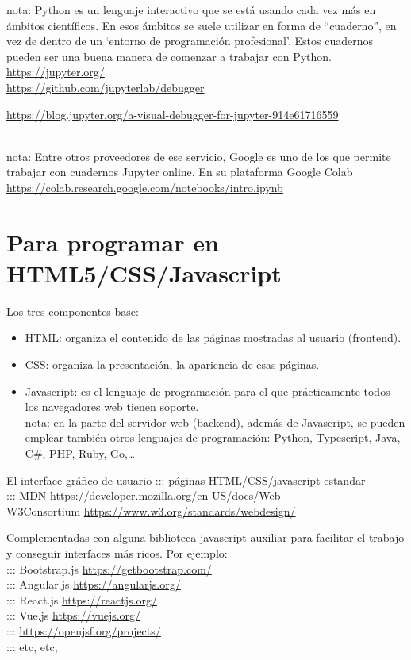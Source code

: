 \documentclass[spanish,12pt,a4paper,final,oneside]{book}
\begin{document}
nota: Python es un lenguaje interactivo que se está usando cada vez más en ámbitos científicos. En esos ámbitos se suele utilizar en forma de ``cuaderno'', en vez de dentro de un `entorno de programación profesional'. Estos cuadernos pueden ser una buena manera de comenzar a trabajar con Python.
\\ \url{https://jupyter.org/}
\\ \url{https://github.com/jupyterlab/debugger}
\\ \begin{footnotesize}\url{https://blog.jupyter.org/a-visual-debugger-for-jupyter-914e61716559}\end{footnotesize}
\\nota: Entre otros proveedores de ese servicio, Google es uno de los que permite trabajar con cuadernos Jupyter online. En su plataforma Google Colab \url{https://colab.research.google.com/notebooks/intro.ipynb}

\section{Para programar en HTML5/CSS/Javascript}

Los tres componentes base:
\begin{itemize}
\item HTML: organiza el contenido de las páginas mostradas al usuario (frontend).
\item CSS: organiza la presentación, la apariencia de esas páginas.
\item Javascript: es el lenguaje de programación para el que prácticamente todos los navegadores web tienen soporte.
\\{\footnotesize nota: en la parte del servidor web (backend), además de Javascript, se pueden emplear también otros lenguajes de programación: Python, Typescript, Java, C\#, PHP, Ruby, Go,\ldots}
\end{itemize}

El interface gráfico de usuario ::: páginas HTML/CSS/javascript estandar
\\::: MDN \url{https://developer.mozilla.org/en-US/docs/Web}
\\W3Consortium \url{https://www.w3.org/standards/webdesign/}

Complementadas con alguna biblioteca javascript auxiliar para facilitar el trabajo y conseguir interfaces más ricos. Por ejemplo:
\\::: Bootstrap.js \url{https://getbootstrap.com/}
\\::: Angular.js \url{https://angularjs.org/}
\\::: React.js \url{https://reactjs.org/}
\\::: Vue.js \url{https://vuejs.org/}
\\::: \url{https://openjsf.org/projects/}
\\::: etc, etc,
\end{document}
